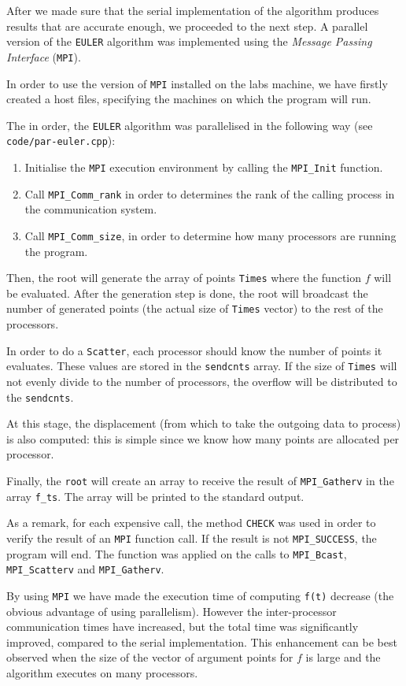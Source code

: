 After we made sure that the serial implementation of the algorithm produces results that
are accurate enough, we proceeded to the next step.
A parallel version of the \texttt{EULER} algorithm was implemented using the \emph{Message Passing Interface} (\texttt{MPI}).

In order to use the version of \texttt{MPI} installed on the labs machine, we have firstly created a host files,
specifying  the machines on which the program will run.

The in order, the \texttt{EULER} algorithm was parallelised in the following way (see \texttt{code/par-euler.cpp}):
\begin{enumerate}
 \item{Initialise the \texttt{MPI} execution environment by calling the \texttt{MPI\_Init} function.}
 \item{Call \texttt{MPI\_Comm\_rank} in order to determines the rank of the calling process in the communication system.}
 \item{Call \texttt{MPI\_Comm\_size}, in order to determine how many processors are running the program.}
\end{enumerate}

Then, the root will generate the array of points \texttt{Times} where the function $f$ will be evaluated.
After the generation step is done, the root will broadcast the number of generated points (the actual size of 
\texttt{Times} vector) to the rest of the processors.
\newline

In order to do a \texttt{Scatter}, each processor should know the number of points it evaluates. These
values are stored in the \texttt{sendcnts} array. If the size of \texttt{Times} will not evenly divide to the
number of processors, the overflow will be distributed to the \texttt{sendcnts}.

At this stage, the displacement (from which to take the outgoing data to process) is also computed: 
this is simple since we know how many points are allocated per processor.


Finally, the \texttt{root} will create an array to receive the result of \texttt{MPI\_Gatherv} in the array \texttt{f\_ts}.
The array will be printed to the standard output.

As a remark, for each expensive call, the method \texttt{CHECK} was used in order to verify the result of an \texttt{MPI} function call. 
If the result is not \texttt{MPI\_SUCCESS}, the program will end. The function was applied on the calls to \texttt{MPI\_Bcast}, \texttt{MPI\_Scatterv}  and \texttt{MPI\_Gatherv}.

By using \texttt{MPI} we have made the execution time of computing \texttt{f(t)} decrease (the obvious advantage of using parallelism). 
However the inter-processor communication times have increased, but the total time was significantly improved, compared
to the serial implementation. This enhancement can be best observed when the size of the vector of argument points for $f$ is large and the algorithm executes on many processors.

